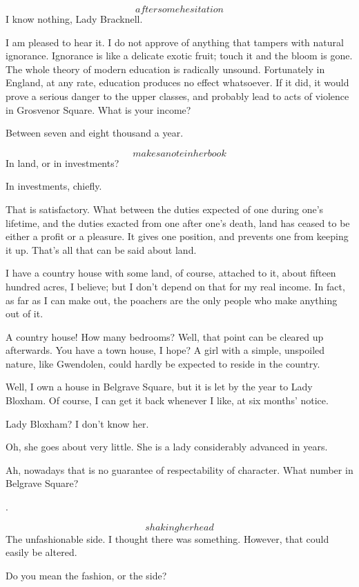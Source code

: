 \documentclass{book}
\begin{document}
\1  \[after some hesitation\]  I know nothing, Lady Bracknell.

\3  I am pleased to hear it.  I do not approve of
anything that tampers with natural ignorance.  Ignorance is like a
delicate exotic fruit; touch it and the bloom is gone.  The whole
theory of modern education is radically unsound.  Fortunately in
England, at any rate, education produces no effect whatsoever.  If
it did, it would prove a serious danger to the upper classes, and
probably lead to acts of violence in Grosvenor Square.  What is
your income?

\1  Between seven and eight thousand a year.

\3  \[makes a note in her book\]  In land, or in
investments?

\1  In investments, chiefly.

\3  That is satisfactory.  What between the duties
expected of one during one's lifetime, and the duties exacted from
one after one's death, land has ceased to be either a profit or a
pleasure.  It gives one position, and prevents one from keeping it
up.  That's all that can be said about land.

\1  I have a country house with some land, of course, attached
to it, about fifteen hundred acres, I believe; but I don't depend
on that for my real income.  In fact, as far as I can make out, the
poachers are the only people who make anything out of it.

\3  A country house!  How many bedrooms?  Well, that
point can be cleared up afterwards.  You have a town house, I hope?
A girl with a simple, unspoiled nature, like Gwendolen, could
hardly be expected to reside in the country.

\1  Well, I own a house in Belgrave Square, but it is let by the
year to Lady Bloxham.  Of course, I can get it back whenever I
like, at six months' notice.

\3  Lady Bloxham?  I don't know her.

\1  Oh, she goes about very little.  She is a lady considerably
advanced in years.

\3  Ah, nowadays that is no guarantee of
respectability of character.  What number in Belgrave Square?

\1  .

\3  \[shaking her head\]  The unfashionable side.  I
thought there was something.  However, that could easily be
altered.

\1  Do you mean the fashion, or the side?
\end{document}
